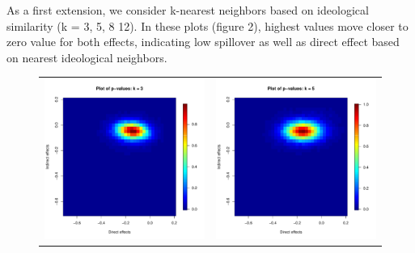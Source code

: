 \documentclass[12pt]{article}
\begin{document}
As a first extension, we consider k-nearest neighbors based on ideological similarity (k = 3, 5, 8 12). In these plots (figure 2), highest values move closer to zero value for both effects, indicating low spillover as well as direct effect based on nearest ideological neighbors.
\begin{figure}
	\centering
	\begin{tabular}{cc}
	\includegraphics[scale=0.45]{./images/pvalues_figure_3nn_Coppock.pdf} &
	\includegraphics[scale=0.45]{./images/pvalues_figure_5nn_Coppock.pdf} \\ 

\end{tabular}
\end{figure}
\end{document}
